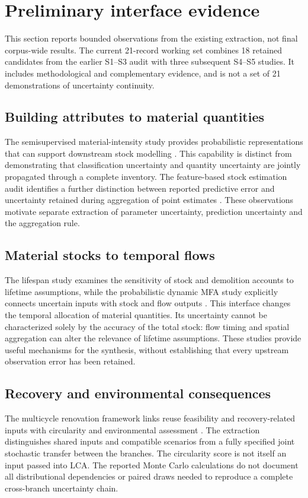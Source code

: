 \section{Preliminary interface evidence}
This section reports bounded observations from the existing extraction, not final corpus-wide results. The current 21-record working set combines 18 retained candidates from the earlier S1--S3 audit with three subsequent S4--S5 studies. It includes methodological and complementary evidence, and is not a set of 21 demonstrations of uncertainty continuity.

\subsection{Building attributes to material quantities}
The semisupervised material-intensity study provides probabilistic representations that can support downstream stock modelling \citep{U03}. This capability is distinct from demonstrating that classification uncertainty and quantity uncertainty are jointly propagated through a complete inventory. The feature-based stock estimation audit identifies a further distinction between reported predictive error and uncertainty retained during aggregation of point estimates \citep{U05}. These observations motivate separate extraction of parameter uncertainty, prediction uncertainty and the aggregation rule.

\subsection{Material stocks to temporal flows}
The lifespan study examines the sensitivity of stock and demolition accounts to lifetime assumptions, while the probabilistic dynamic MFA study explicitly connects uncertain inputs with stock and flow outputs \citep{U11,U12}. This interface changes the temporal allocation of material quantities. Its uncertainty cannot be characterized solely by the accuracy of the total stock: flow timing and spatial aggregation can alter the relevance of lifetime assumptions. These studies provide useful mechanisms for the synthesis, without establishing that every upstream observation error has been retained.

\subsection{Recovery and environmental consequences}
The multicycle renovation framework links reuse feasibility and recovery-related inputs with circularity and environmental assessment \citep{U19}. The extraction distinguishes shared inputs and compatible scenarios from a fully specified joint stochastic transfer between the branches. The circularity score is not itself an input passed into LCA. The reported Monte Carlo calculations do not document all distributional dependencies or paired draws needed to reproduce a complete cross-branch uncertainty chain.

